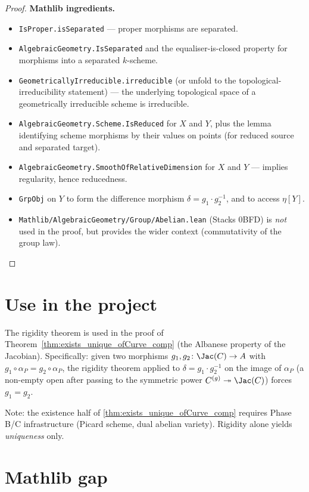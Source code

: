 \begin{proof}
  \medskip
  \noindent\textbf{Mathlib ingredients.}
  \begin{itemize}
    \item \lstinline{IsProper.isSeparated} — proper morphisms are separated.
    \item \lstinline{AlgebraicGeometry.IsSeparated} and the equaliser-is-closed property for morphisms into a separated $k$-scheme.
    \item \lstinline{GeometricallyIrreducible.irreducible} (or unfold to the topological-irreducibility statement) — the underlying topological space of a geometrically irreducible scheme is irreducible.
    \item \lstinline{AlgebraicGeometry.Scheme.IsReduced} for $X$ and $Y$, plus the lemma identifying scheme morphisms by their values on points (for reduced source and separated target).
    \item \lstinline{AlgebraicGeometry.SmoothOfRelativeDimension} for $X$ and $Y$ — implies regularity, hence reducedness.
    \item \lstinline{GrpObj} on $Y$ to form the difference morphism $\delta = g_1 \cdot g_2^{-1}$, and to access $\eta[Y]$.
    \item \lstinline{Mathlib/AlgebraicGeometry/Group/Abelian.lean} (Stacks 0BFD) is \emph{not} used in the proof, but provides the wider context (commutativity of the group law).
  \end{itemize}
\end{proof}

\section{Use in the project}

The rigidity theorem is used in the proof of Theorem~\ref{thm:exists_unique_ofCurve_comp} (the Albanese property of the Jacobian). Specifically: given two morphisms $g_1, g_2 \colon \Jac(C) \to A$ with $g_1 \circ \alpha_P = g_2 \circ \alpha_P$, the rigidity theorem applied to $\delta = g_1 \cdot g_2^{-1}$ on the image of $\alpha_P$ (a non-empty open after passing to the symmetric power $C^{(g)} \twoheadrightarrow \Jac(C)$) forces $g_1 = g_2$.

Note: the existence half of \ref{thm:exists_unique_ofCurve_comp} requires Phase B/C infrastructure (Picard scheme, dual abelian variety). Rigidity alone yields \emph{uniqueness} only.

\section{Mathlib gap}

